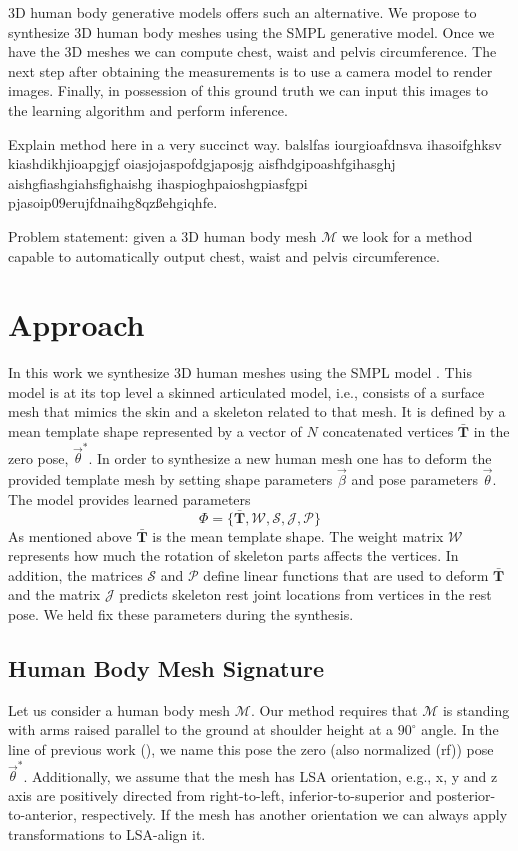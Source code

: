 \documentclass[10pt,twocolumn,letterpaper]{article}
\begin{document}
3D human body generative models offers such an alternative. We propose to 
synthesize 3D human body meshes using the SMPL \cite{Loper.2015} generative 
model. Once we have 
the 3D meshes we can compute chest, waist and pelvis circumference. The next 
step after obtaining the 
measurements is to use a camera model to render
images. Finally, in possession of this ground truth we can 
input this images to the learning algorithm and perform inference.

Explain method here in a very succinct way. balslfas iourgioafdnsva 
ihasoifghksv kiashdikhjioapgjgf oiasjojaspofdgjaposjg aisfhdgipoashfgihasghj 
aishgfiashgiahsfighaishg ihaspioghpaioshgpiasfgpi 
pjasoip09erujfdnaihg8qzßehgiqhfe.

Problem statement: given a 3D human body mesh $\mathcal{M}$ we look for a 
method capable to automatically output chest, waist and pelvis circumference.

\section{Approach}

In this work we synthesize 3D human meshes using the SMPL
model \cite{Loper.2015}. This model is at its top level a skinned articulated 
model, i.e., 
consists of a 
surface mesh that mimics the skin and a skeleton related to that mesh. It is 
defined by a mean 
template shape represented by a vector of $N$ concatenated vertices 
$\mathbf{\bar{T}}$ in the zero pose, $\vec{\theta}^*$. In order 
to 
synthesize a 
new human mesh one has to deform the provided template mesh by 
setting shape parameters $\vec{\beta}$ and pose parameters $\vec{\theta}$. The 
model provides learned parameters
\begin{equation} \label{eq:smpl_params}
\Phi = \{\mathbf{\bar{T}}, \mathcal{W}, \mathcal{S}, \mathcal{J}, 
\mathcal{P}\}
\end{equation}
As mentioned above $\mathbf{\bar{T}}$ is the mean template shape. The weight 
matrix $\mathcal{W}$ represents how much the rotation of skeleton parts affects 
the vertices. In addition, the matrices $\mathcal{S}$ and $\mathcal{P}$ define 
linear functions that are used to deform $\mathbf{\bar{T}}$ and the matrix 
$\mathcal{J}$ predicts skeleton rest joint locations from vertices in the rest 
pose. We held fix these parameters during the synthesis.

\subsection{Human Body Mesh Signature}
Let us consider a human body mesh $\mathcal{M}$. Our method requires that 
$\mathcal{M}$ is standing with arms raised 
parallel to the 
ground at shoulder height at a $90^\circ$ angle. In the line 
of previous work (\cite{Dibra.2016a}), we name this pose the zero (also 
normalized (rf)) pose $\vec{\theta}^*$. Additionally, we assume that the mesh 
has LSA orientation, e.g., x, y and z axis are positively directed from 
right-to-left, inferior-to-superior and posterior-to-anterior, respectively. If 
the mesh has another orientation we can always apply transformations to 
LSA-align it.
\end{document}
